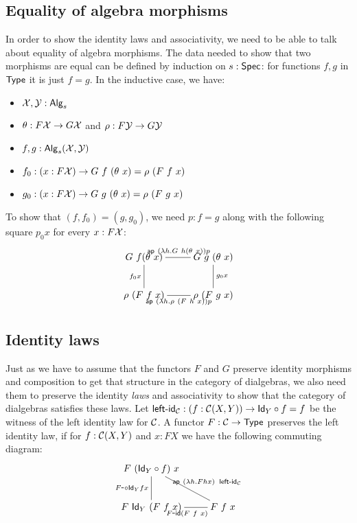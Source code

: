 \documentclass[a4paper,10pt]{report}
\begin{document}
\subsection{Equality of algebra morphisms}

In order to show the identity laws and associativity, we need to be
able to talk about equality of algebra morphisms. The data needed to
show that two morphisms are equal can be defined by induction on
$s : \mathsf{Spec}$: for functions $f, g$ in $\mathsf{Type}$ it is just $f = g$. In
the inductive case, we have:
%
\begin{itemize}
\item $\mathcal{X}, \mathcal{Y} : \mathsf{Alg}_s$
\item $\theta : F \mathcal{X} \to G \mathcal{X}$ and $\rho : F \mathcal{Y} \to G \mathcal{Y}$
\item $f, g : \mathsf{Alg}_s(\mathcal{X},\mathcal{Y})$
\item $f_0 : (x : F \alg{X}) \to G\ f\ (\theta\ x) = \rho\ (F\ f\ x)$
\item $g_0 : (x : F \alg{X}) \to G\ g\ (\theta\ x) = \rho\ (F\ g\ x)$
\end{itemize}
%
To show that $(f,f_0) = (g,g_0)$, we need $p : f = g$ along with the
following square $p_0 x$ for every $x : F \mathcal{X}$:
$$
\xymatrix{
G\ f (\theta\ x) \ar@{-}[d]_{f_0 x} \ar@{-}[r]^{\ap\ (\lambda h . G\ h (\theta\ x)) p}  &G\ g\ (\theta\ x) \ar@{-}[d]^{g_0 x} \\
\rho\ (F\ f\ x) \ar@{-}[r]_{\ap\ (\lambda h . \rho\ (F\ h\ x)) p} &\rho\ (F\ g\ x) }
$$
\subsection{Identity laws}

Just as we have to assume that the functors $F$ and $G$ preserve
identity morphisms and composition to get that structure in the
category of dialgebras, we also need them to preserve the identity
\emph{laws} and associativity to show that the category of dialgebras
satisfies these laws. Let
$\operatorname{\mathsf{left-id}}_{\mathcal{C}} : (f : \mathcal{C}(X,Y)) \to \mathsf{Id}_{Y} \circ f = f$ be the witness
of the left identity law for $\mathcal{C}$. A functor $F : \mathcal{C} \to \mathsf{Type}$
preserves the left identity law, if for $f : \mathcal{C} (X,Y)$ and $x : FX$ we
have the following commuting diagram:
$$
\xymatrix{
F\ (\Id{Y} \circ f)\ x \ar@{-}[d]_{\Fcomp \Id{Y} f x} \ar@{-}[dr]^{\ap\ (\lambda h . F h x)\ \leftid_{\C}}\\
F\ \Id{Y}\ (F\ f\ x) \ar@{-}[r]_{\Fid (F\ f\ x)} &F\ f\ x
}
$$
\end{document}
